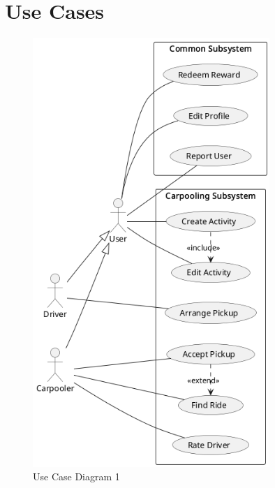 \documentclass[11pt]{article}
\begin{document}
\newpage

\section{Use Cases}








\begin{figure}
    \centering
    \includegraphics[width=0.8\textwidth]{use-cases-carpooling}
    \caption{Use Case Diagram 1}
\end{figure}
\end{document}
